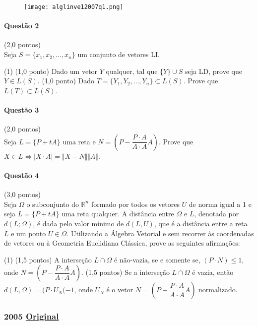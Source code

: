 \documentclass[12pt,a4paper]{article}
\newcommand{\R}{\mathbb{R}}
\newcommand{\modu}[1]{\vert #1 \vert}
\newcommand{\norm}[1]{\Vert #1 \Vert}
\newcommand{\original}[1]{\tiny \href{#1}{Original} \normalsize}
\begin{document}
\begin{figure}[h]\centering\texttt{[image: alglinve12007q1.png]}\end{figure}

\paragraph{Questão 2} (2,0 pontos)\\
Seja $S=\{x_1, x_2, \dots, x_n\}$ um conjunto de vetores LI.
\begin{tasks}(1)
\task (1,0 ponto) Dado um vetor $Y$ qualquer, tal que $\{Y\} \cup S$ seja LD, prove que $Y \in L(S)$.
\task (1,0 ponto) Dado $T = \{Y_1, Y_2, \dots, Y_n\} \subset L(S)$. Prove que $L(T) \subset L(S)$.
\end{tasks}

\paragraph{Questão 3} (2,0 pontos)\\
Seja $L=\{P+tA\}$ uma reta e $N=\left(P-\dfrac{P\cdot A}{A\cdot A}A  \right)$. Prove que $X\in L \iff \modu{X\cdot A} = \norm{X-N}\norm{A}$.

\paragraph{Questão 4} (3,0 pontos)\\
Seja $\Omega$ o subconjunto do $\R^n$ formado por todos os vetores $U$ de norma igual a 1 e seja $L=\{P+tA\}$ uma reta qualquer. A distância entre $\Omega$ e $L$, denotada por $d(L;\Omega)$, é dada pelo valor mínimo de $d(L,U)$, que é a distância entre a reta $L$ e um ponto $U\in \Omega$. Utilizando a Álgebra Vetorial e sem recorrer às coordenadas de vetores ou à Geometria Euclidiana Clássica, prove as seguintes afirmações:
\begin{tasks}(1)
\task (1,5 pontos) A interseção $L\cap \Omega$ é não-vazia, se e somente se, $(P\cdot N) \le 1$, onde $N=\left(P-\dfrac{P\cdot A}{A\cdot A}A  \right)$.
\task (1,5 pontos) Se a interseção $L\cap \Omega$ é vazia, então $d(L,\Omega) = (P\cdot U_N(-1$, onde $U_N$ é o vetor $N=\left(P-\dfrac{P\cdot A}{A\cdot A}A  \right)$ normalizado.
\end{tasks}

\newpage

\subsubsection{2005 \original{https://drive.google.com/file/d/1wDKOotxwp-mxfQW3jt-Kze9_wpE9ngzC/view?usp=sharing}}
\end{document}
